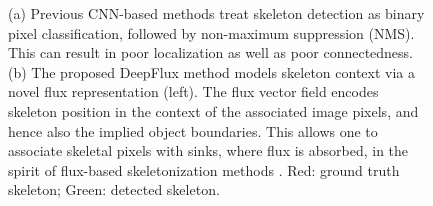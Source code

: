 \documentclass[10pt,twocolumn,letterpaper]{article}
\begin{document}
\begin{figure}
\centering
{}
\caption{(a) Previous CNN-based methods treat skeleton detection as binary pixel classification, followed by non-maximum suppression (NMS). This can result in poor localization as well as poor connectedness. (b) The proposed DeepFlux method models skeleton context via a novel flux representation (left). The flux vector field encodes skeleton position in the context of the associated image pixels, and hence also the implied object boundaries. This allows one to associate skeletal pixels with sinks, where flux is absorbed, in the spirit of flux-based skeletonization methods \cite{siddiqi2002hamilton}. Red: ground truth skeleton; Green: detected skeleton.}
\label{fig:motivation}
\end{figure}
\end{document}
